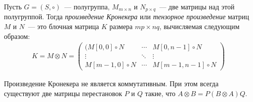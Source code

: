 \begin{definition}
    Пусть $G = (S, \circ)$~--- полугруппа, $M_{m \times n}$ и $N_{p \times q}$~--- две матрицы над этой полугруппой.
    Тогда \emph{произведение Кронекера} или \emph{тензорное произведение} матриц $M$ и $N$~--- это блочная матрица $K$ размера $mp \times nq$, вычисляемая следующим образом:
    \begin{multline*}
        K = M \otimes N = 
        \begin{pmatrix}
            (M[0,0] \circ N  & \cdots & M[0,n-1] \circ N   \\
            \vdots           & \ddots & \vdots             \\
            M[m-1,0] \circ N & \cdots & M[m-1,n-1] \circ N
        \end{pmatrix}
    \end{multline*}
\end{definition}

\begin{remark}
    \label{note:KronIsNotCommutative}
    Произведение Кронекера не является коммутативным.
    При этом всегда существуют две матрицы перестановок $P$ и $Q$ такие, что $A \otimes B = P(B \otimes A)Q$.
\end{remark}

\begingroup
\newcommand{\examplemtrx}
{
    \begin{pmatrix}
        5  & 6  & 7  & 8  \\
        9  & 10 & 11 & 12 \\
        13 & 14 & 15 & 16
    \end{pmatrix}
}

